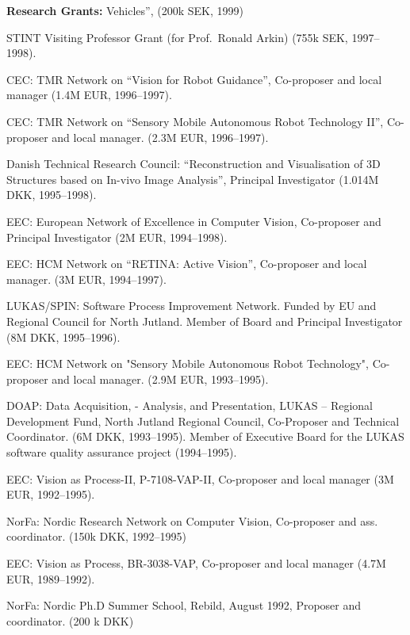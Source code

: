 \documentclass{article}
\begin{document}
\begin{cv}
\begin{cvlist}{\bf Research Grants:}
		Vehicles'', (200k SEK, 1999)%
		\item STINT Visiting Professor Grant (for Prof.\ Ronald Arkin)  (755k
		SEK, 1997--1998).%
		\item CEC: TMR Network on ``Vision for Robot Guidance'', Co-proposer
		and local manager (1.4M EUR, 1996--1997).%
		\item CEC: TMR Network on ``Sensory Mobile Autonomous Robot Technology
		II'', Co-proposer and local manager.  (2.3M EUR, 1996--1997).%
		\item Danish Technical Research Council: ``Reconstruction and
		Visualisation of 3D Structures based on In-vivo Image Analysis'',
		Principal Investigator (1.014M DKK, 1995--1998).%
		\item EEC: European Network of Excellence in Computer Vision,
		Co-proposer and Principal Investigator (2M EUR, 1994--1998).%
		\item EEC: HCM Network on ``RETINA: Active Vision'', Co-proposer and
		local manager.  (3M EUR, 1994--1997).%
		\item LUKAS/SPIN: Software Process Improvement Network. Funded by EU
		and Regional Council for North Jutland. Member of Board and
		Principal Investigator (8M DKK, 1995--1996).%
		\item EEC: HCM Network on "Sensory Mobile Autonomous Robot
		Technology", Co-proposer and local manager.  (2.9M EUR,
		1993--1995).%
		\item DOAP: Data Acquisition, - Analysis, and Presentation, LUKAS --
		Regional Development Fund, North Jutland Regional Council,
		Co-Proposer and Technical Coordinator. (6M DKK, 1993--1995). Member
		of  Executive Board for the LUKAS software quality assurance project
		(1994--1995).%
		\item EEC: Vision as Process-II, P-7108-VAP-II, Co-proposer and local
		manager (3M EUR, 1992--1995).%
		\item NorFa: Nordic Research Network on Computer Vision, Co-proposer
		and ass. coordinator.  (150k DKK, 1992--1995)%
		\item EEC: Vision as Process, BR-3038-VAP, Co-proposer and local
		manager (4.7M EUR, 1989--1992).%
		\item NorFa: Nordic Ph.D Summer School, Rebild, August 1992, Proposer
		and coordinator. (200 k DKK)%
	\end{cvlist}


\end{cv}
\end{document}
